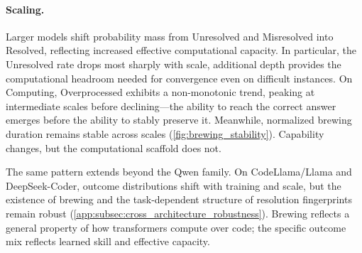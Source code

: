 
\paragraph{Scaling.}
Larger models shift probability mass from Unresolved and Misresolved into Resolved, reflecting increased effective computational capacity. In particular, the Unresolved rate drops most sharply with scale, additional depth provides the computational headroom needed for convergence even on difficult instances. On Computing, Overprocessed exhibits a non-monotonic trend, peaking at intermediate scales before declining---the ability to reach the correct answer emerges before the ability to stably preserve it. Meanwhile, normalized brewing duration remains stable across scales (\cref{fig:brewing_stability}). Capability changes, but the computational scaffold does not.


The same pattern extends beyond the Qwen family. On CodeLlama/Llama and DeepSeek-Coder, outcome distributions shift with training and scale, but the existence of brewing and the task-dependent structure of resolution fingerprints remain robust (\cref{app:subsec:cross_architecture_robustness}). Brewing reflects a general property of how transformers compute over code; the specific outcome mix reflects learned skill and effective capacity.
